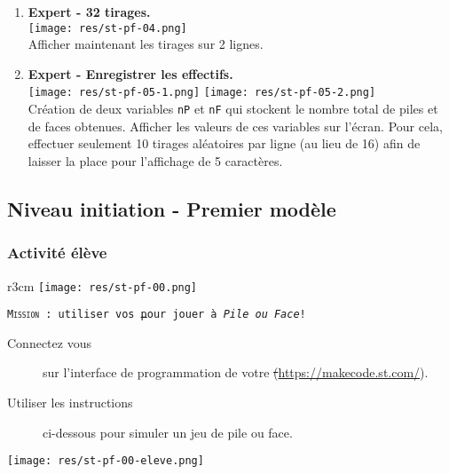 \begin{methode}
\begin{enumerate}
    \item
        \textbf{Expert - 32 tirages.} \\
        \texttt{[image: res/st-pf-04.png]}\\Afficher maintenant les tirages sur 2 lignes.
    \item
        \textbf{Expert - Enregistrer les effectifs.} \\
        \texttt{[image: res/st-pf-05-1.png]} \quad
        \texttt{[image: res/st-pf-05-2.png]}\\Création de deux variables \texttt{nP} et \texttt{nF} qui stockent le nombre total de piles et de faces obtenues. Afficher les valeurs de ces variables sur l'écran. Pour cela, effectuer seulement 10 tirages aléatoires par ligne (au lieu de 16) afin de laisser la place pour l'affichage de 5 caractères. 
\end{enumerate}
\end{methode}

%
%
\newpage
\subsection{Niveau initiation - Premier modèle }
\subsubsection{Activité élève}




%
%
\begin{wrapfigure}[4]{r}{3cm}
    \texttt{[image: res/st-pf-00.png]}
\end{wrapfigure}

\begin{eleve}    
    \texttt{\textsc{Mission} : utiliser vos \st pour jouer à \emph{Pile ou Face}!}
    
    \begin{description}
        \item [Connectez vous] sur l'interface de programmation de votre \st (\url{https://makecode.st.com/}).
        \item [Utiliser les instructions] ci-dessous pour simuler un jeu de pile ou face.
    \end{description}
    
    \centerline{\texttt{[image: res/st-pf-00-eleve.png]}}
\end{eleve}
%
%

